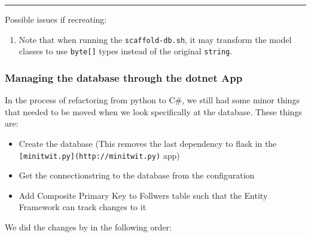 \begin{center}\rule{0.5\linewidth}{0.5pt}\end{center}

Possible issues if recreating:

\begin{enumerate}
    \item Note that when running the \texttt{scaffold-db.sh}, it may transform the model classes to use \texttt{byte{[}{]}} types instead of the original \texttt{string}.
\end{enumerate}

\subsubsection{Managing the database through the dotnet
App}
\label{log:managing-the-database-through-the-dotnet-app}

In the process of refactoring from python to C\#, we still had some
minor things that needed to be moved when we look specifically at the
database. These things are:

\begin{itemize}
    \item Create the database (This removes the last dependency to flask in the \texttt{{[}minitwit.py{]}(http://minitwit.py)} app)
    \item Get the connectionstring to the database from the configuration
    \item Add Composite Primary Key to Follwers table such that the Entity Framework can track changes to it
\end{itemize}

We did the changes by in the following order:

